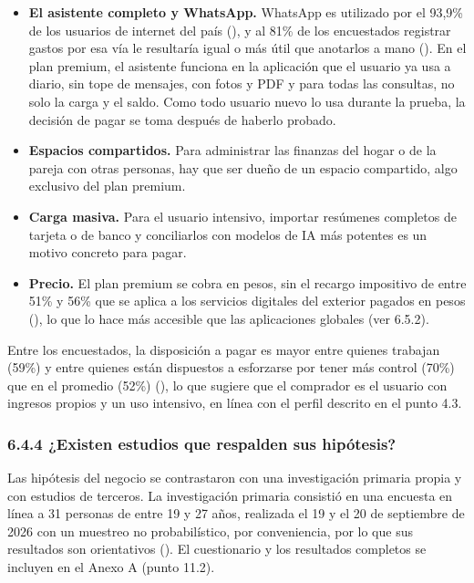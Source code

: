 \begin{itemize}
\tightlist
\item
  \textbf{El asistente completo y WhatsApp.} WhatsApp es utilizado por
  el 93,9\% de los usuarios de internet del país
  (), y al 81\% de los
  encuestados registrar gastos por esa vía le resultaría igual o más
  útil que anotarlos a mano
  (). En el plan
  premium, el asistente funciona en la aplicación que el usuario ya usa
  a diario, sin tope de mensajes, con fotos y PDF y para todas las
  consultas, no solo la carga y el saldo. Como todo usuario nuevo lo usa
  durante la prueba, la decisión de pagar se toma después de haberlo
  probado.
\item
  \textbf{Espacios compartidos.} Para administrar las finanzas del hogar
  o de la pareja con otras personas, hay que ser dueño de un espacio
  compartido, algo exclusivo del plan premium.
\item
  \textbf{Carga masiva.} Para el usuario intensivo, importar resúmenes
  completos de tarjeta o de banco y conciliarlos con modelos de IA más
  potentes es un motivo concreto para pagar.
\item
  \textbf{Precio.} El plan premium se cobra en pesos, sin el recargo
  impositivo de entre 51\% y 56\% que se aplica a los servicios
  digitales del exterior pagados en pesos
  (), lo que lo hace
  más accesible que las aplicaciones globales (ver 6.5.2).
\end{itemize}

Entre los encuestados, la disposición a pagar es mayor entre quienes
trabajan (59\%) y entre quienes están dispuestos a esforzarse por tener
más control (70\%) que en el promedio (52\%)
(), lo que sugiere
que el comprador es el usuario con ingresos propios y un uso intensivo,
en línea con el perfil descrito en el punto 4.3.

\subsubsection*{6.4.4 ¿Existen estudios que respalden sus
hipótesis?}\label{existen-estudios-que-respalden-sus-hipuxf3tesis}

Las hipótesis del negocio se contrastaron con una investigación primaria
propia y con estudios de terceros. La investigación primaria consistió
en una encuesta en línea a 31 personas de entre 19 y 27 años, realizada
el 19 y el 20 de septiembre de 2026 con un muestreo no probabilístico,
por conveniencia, por lo que sus resultados son orientativos
(). El cuestionario y
los resultados completos se incluyen en el Anexo A (punto 11.2).

